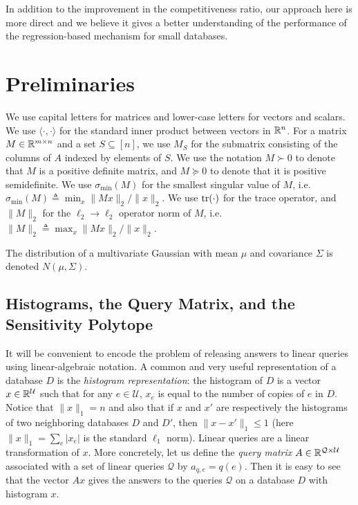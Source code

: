 \documentclass{article}
\def\tr{{\rm tr}} \def\rank{{\rm rank}}
\newcommand{\univ}{U}
\renewcommand{\univ}{\mathcal{U}}
\newcommand{\quer}{\mathcal{Q}}
\newcommand{\row}{e}
\begin{document}
In addition to the improvement in the competitiveness ratio, our
approach here is more direct and we believe it gives a better
understanding of the performance of the regression-based mechanism for
small databases.

\section{Preliminaries}

We use capital letters for matrices and lower-case letters for vectors
and scalars. We use $\langle \cdot, \cdot \rangle$ for the standard
inner product between vectors in ${\mathbb{R}}^n$. For a matrix $M \in
{\mathbb{R}}^{m\times n}$ and a set $S \subseteq [n]$, we use $M_S$ for the
submatrix consisting of the columns of $A$ indexed by elements of
$S$. We use the notation $M \succ 0$ to denote that $M$ is a positive
definite matrix, and $M\succeq 0$ to denote that it is positive
semidefinite. We use $\sigma_{\min}(M)$ for the smallest singular
value of $M$, i.e.~$\sigma_{\min}(M) \triangleq
\min_{x}{\|Mx\|_2/\|x\|_2}$. We use $\tr(\cdot)$ for the trace operator, and
$\|M\|_2$ for the $\ell_2\to\ell_2$ operator norm of $M$,
i.e.~$\|M\|_2 \triangleq \max_{x}{\|Mx\|_2/\|x\|_2}$.

The distribution of a multivariate Gaussian
with mean $\mu$ and covariance $\Sigma$ is denoted $N(\mu, \Sigma)$.

\subsection{Histograms, the Query Matrix, and the Sensitivity Polytope}

It will be convenient to encode the problem of releasing answers to
linear queries using linear-algebraic notation. A common and very
useful representation of a database $D$ is the
\emph{histogram representation}: the histogram of $D$ is a vector $x
\in \R^\univ$ such that for any $\row \in \univ$, $x_\row$ is equal to
the number of copies of $\row$ in $D$. Notice that $\|x\|_1 = n$ and
also that if $x$ and $x'$ are respectively the histograms of two
neighboring databases $D$ and $D'$, then $\|x - x'\|_1 \leq 1$ (here
$\|x\|_1 = \sum_{\row}{|x_\row|}$ is the standard $\ell_1$
norm). Linear queries are a linear transformation of $x$. More
concretely, let us define the \emph{query matrix} $A \in \R^{\quer
  \times \univ}$ associated with a set of linear queries $\quer$ by
$a_{q, \row} = q(\row)$. Then it is easy to see that the vector $Ax$
gives the answers to the queries $\quer$ on a database $D$ with
histogram $x$.
\end{document}
